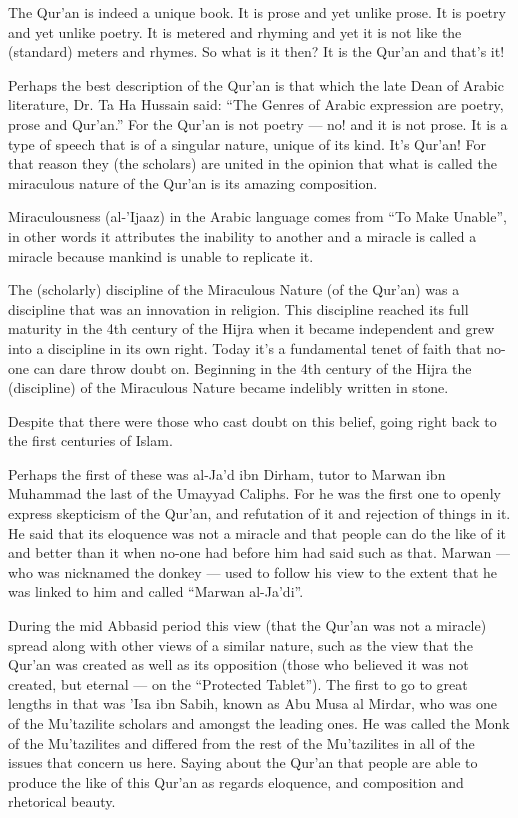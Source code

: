 \documentclass[12pt]{book}
\begin{document}
The Qur’an is indeed a unique book. It is prose and yet unlike prose. It is
poetry and yet unlike poetry. It is metered and rhyming and yet it is not like
the (standard) meters and rhymes. So what is it then? It is the Qur’an and
that’s it!

Perhaps the best description of the Qur’an is that which the late Dean of
Arabic literature, Dr. Ta Ha Hussain said: “The Genres of Arabic expression are
poetry, prose and Qur’an.” For the Qur’an is not poetry — no! and it is not
prose. It is a type of speech that is of a singular nature, unique of its kind.
It’s Qur’an! For that reason they (the scholars) are united in the opinion that
what is called the miraculous nature of the Qur’an is its amazing composition.

Miraculousness (al-’Ijaaz) in the Arabic language comes from “To Make Unable”,
in other words it attributes the inability to another and a miracle is called a
miracle because mankind is unable to replicate it.

The (scholarly) discipline of the Miraculous Nature (of the Qur’an) was a
discipline that was an innovation in religion. This discipline reached its full
maturity in the 4th century of the Hijra when it became independent and grew
into a discipline in its own right. Today it’s a fundamental tenet of faith
that no-one can dare throw doubt on. Beginning in the 4th century of the Hijra
the (discipline) of the Miraculous Nature became indelibly written in stone.

Despite that there were those who cast doubt on this belief, going right back
to the first centuries of Islam.

Perhaps the first of these was al-Ja’d ibn Dirham, tutor to Marwan ibn Muhammad
the last of the Umayyad Caliphs. For he was the first one to openly express
skepticism of the Qur’an, and refutation of it and rejection of things in it.
He said that its eloquence was not a miracle and that people can do the like of
it and better than it when no-one had before him had said such as that. Marwan
— who was nicknamed the donkey — used to follow his view to the extent that he
was linked to him and called “Marwan al-Ja’di”\footnotemark.


During the mid Abbasid period this view (that the Qur’an was not a miracle)
spread along with other views of a similar nature, such as the view that the
Qur’an was created as well as its opposition (those who believed it was not
created, but eternal — on the “Protected Tablet”). The first to go to great
lengths in that was ’Isa ibn Sabih, known as Abu Musa al Mirdar, who was one of
the Mu’tazilite scholars and amongst the leading ones. He was called the Monk
of the Mu’tazilites and differed from the rest of the Mu’tazilites in all of
the issues that concern us here. Saying about the Qur’an that people are able
to produce the like of this Qur’an as regards eloquence, and composition and
rhetorical beauty\footnotemark.
\end{document}
